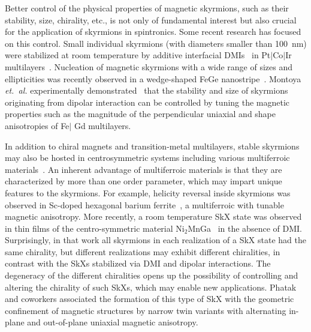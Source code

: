 \documentclass[10pt,onecolumn,prb,aps,notitlepage]{revtex4}
\begin{document}
Better control of the physical properties of magnetic skyrmions, such as
their stability, size, chirality, etc., is not only of fundamental
interest but also crucial for the application of skyrmions in
spintronics. Some recent research has focused on this control. Small
individual skyrmions (with diameters smaller than 100~nm) were stabilized at
room temperature by additive interfacial DMIs~\cite{DZYALOSHINSKY58JPCS_DMintxn,Moriya60PR_DM-intxn} in Pt$\mid $Co$\mid $Ir
multilayers~\cite{Fert16Nat.Nano_add-DMI}.
Nucleation of magnetic skyrmions with a wide range of sizes and ellipticities was recently observed in a wedge-shaped FeGe nanostripe~\cite{cmJin17NatComm_FeGeWedge-skym}. Montoya \textit{et.~al.} experimentally demonstrated~\cite{Montoya17PRB_dipole-skrm}
that the stability and size of skyrmions originating from dipolar
interaction can be controlled by tuning the magnetic properties such as the
magnitude of the perpendicular uniaxial and shape anisotropies of Fe$\mid$%
Gd multilayers.

In addition to chiral magnets and transition-metal
multilayers, stable skyrmions may also be hosted
in centrosymmetric systems including
various multiferroic
materials~\cite{Seki12sci_skrm-multiferroic,Yu&Nagaosa12helicity-reversal-Sk,Langner&Tokura14PRL_skrmCuOSeO,white14PRL_skyrm-CuOSeO,Phatak16NanoLett_skyrm-multiferro}. An inherent advantage of multiferroic materials is that they
are characterized by more than one order parameter, which may impart unique
features to the skyrmions. For example, helicity reversal inside skyrmions was
observed in Sc-doped hexagonal barium ferrite~\cite{Yu&Nagaosa12helicity-reversal-Sk}, a multiferroic with tunable
magnetic anisotropy. More recently, a room temperature SkX state was observed
in thin films of the centro-symmetric material Ni$_{2}$MnGa~\cite{Phatak16NanoLett_skyrm-multiferro}
in the absence of DMI. Surprisingly, in that work all skyrmions in each realization of a
SkX state had the same chirality, but different realizations may exhibit
different chiralities, in contrast with the SkXs stabilized via DMI and
dipolar interactions. The degeneracy of the different chiralities opens up the possibility of controlling and altering the chirality of such SkXs, which may enable new applications. Phatak and coworkers associated the formation of this
type of SkX with the geometric confinement of magnetic structures by narrow
twin variants\cite{Phatak16NanoLett_skyrm-multiferro} with alternating in-plane and out-of-plane uniaxial magnetic anisotropy.
\end{document}
